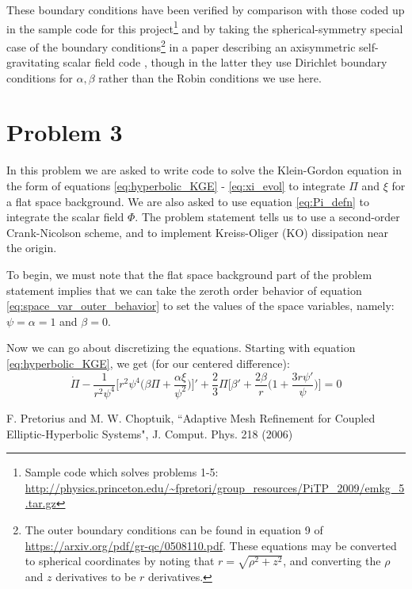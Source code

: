 \documentclass[12pt]{article}
\numberwithin{equation}{section}
\begin{document}
These boundary conditions have been verified by comparison with those coded up in the sample code for this project\footnote{Sample code which solves problems 1-5: \url{http://physics.princeton.edu/~fpretori/group_resources/PiTP_2009/emkg_5.tar.gz}} and by taking the spherical-symmetry special case of the boundary conditions\footnote{The outer boundary conditions can be found in equation 9 of \url{https://arxiv.org/pdf/gr-qc/0508110.pdf}.  These equations may be converted to spherical coordinates by noting that $r = \sqrt{\rho^2 + z^2}$, and converting the $\rho$ and $z$ derivatives to be $r$ derivatives.} in a paper describing an axisymmetric self-gravitating scalar field code \cite{Pretorius06}, though in the latter they use Dirichlet boundary conditions for $\alpha, \beta$ rather than the Robin conditions we use here.

\section{Problem 3}
In this problem we are asked to write code to solve the Klein-Gordon equation in the form of equations \ref{eq:hyperbolic_KGE} - \ref{eq:xi_evol} to integrate $\Pi$ and $\xi$ for a flat space background.  We are also asked to use equation \ref{eq:Pi_defn} to integrate the scalar field $\Phi$.  The problem statement tells us to use a second-order Crank-Nicolson scheme, and to implement Kreiss-Oliger (KO) dissipation near the origin.

To begin, we must note that the flat space background part of the problem statement implies that we can take the zeroth order behavior of equation \ref{eq:space_var_outer_behavior} to set the values of the space variables, namely: $\psi = \alpha = 1$ and $\beta = 0$.

Now we can go about discretizing the equations.  Starting with equation \ref{eq:hyperbolic_KGE}, we get (for our centered difference):
\begin{equation}
\dot{\Pi} - \frac{1}{r^2 \psi^4} \Big[ r^2 \psi^4 \Big( \beta \Pi + \frac{\alpha \xi}{\psi^2} \Big)\Big]' + \frac{2}{3} \Pi \Big[ \beta' + \frac{2 \beta}{r} \Big(1 + \frac{3 r \psi'}{\psi} \Big) \Big] = 0
\end{equation}

\begin{thebibliography}{widestlabel}
	F. Pretorius and M. W. Choptuik, ``Adaptive Mesh Refinement for Coupled Elliptic-Hyperbolic Systems", J. Comput. Phys. 218 (2006)
\end{thebibliography}
\end{document}

